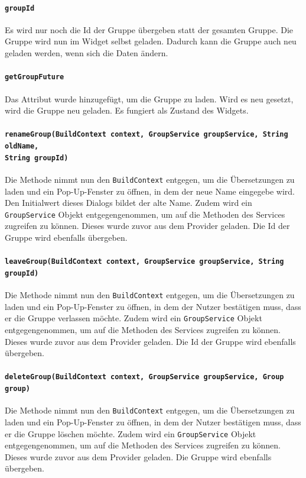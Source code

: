 \documentclass{implementierungsheft}
\begin{document}
\paragraph{\texttt{groupId}}
Es wird nur noch die Id der Gruppe übergeben statt der gesamten Gruppe. Die Gruppe wird nun im Widget selbst geladen. Dadurch kann die Gruppe auch neu geladen werden, wenn sich die Daten ändern.
\paragraph{\texttt{getGroupFuture}}
Das Attribut wurde hinzugefügt, um die Gruppe zu laden. Wird es neu gesetzt, wird die Gruppe neu geladen. Es fungiert als Zustand des Widgets.
\paragraph{\texttt{renameGroup(BuildContext context, GroupService groupService, String oldName,\\ String groupId)}}
Die Methode nimmt nun den \texttt{BuildContext} entgegen, um die Übersetzungen zu laden und ein Pop-Up-Fenster zu öffnen, in dem der neue Name eingegebe wird. Den Initialwert dieses Dialogs bildet der alte Name. Zudem wird ein \texttt{GroupService} Objekt entgegengenommen, um auf die Methoden des Services zugreifen zu können. Dieses wurde zuvor aus dem Provider geladen. Die Id der Gruppe wird ebenfalls übergeben.
\paragraph{\texttt{leaveGroup(BuildContext context, GroupService groupService, String groupId)}}
Die Methode nimmt nun den \texttt{BuildContext} entgegen, um die Übersetzungen zu laden und ein Pop-Up-Fenster zu öffnen, in dem der Nutzer bestätigen muss, dass er die Gruppe verlassen möchte. Zudem wird ein \texttt{GroupService} Objekt entgegengenommen, um auf die Methoden des Services zugreifen zu können. Dieses wurde zuvor aus dem Provider geladen. Die Id der Gruppe wird ebenfalls übergeben.
\paragraph{\texttt{deleteGroup(BuildContext context, GroupService groupService, Group group)}}
Die Methode nimmt nun den \texttt{BuildContext} entgegen, um die Übersetzungen zu laden und ein Pop-Up-Fenster zu öffnen, in dem der Nutzer bestätigen muss, dass er die Gruppe löschen möchte. Zudem wird ein \texttt{GroupService} Objekt entgegengenommen, um auf die Methoden des Services zugreifen zu können. Dieses wurde zuvor aus dem Provider geladen. Die Gruppe wird ebenfalls übergeben.
\end{document}

